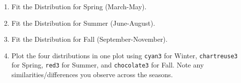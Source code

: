 \documentclass{article}\usepackage[]{graphicx}\usepackage[]{xcolor}
\begin{document}
\begin{enumerate}
\begin{enumerate}
    \item Fit the Distribution for Spring (March-May).
    \item Fit the Distribution for Summer (June-August).
    \item Fit the Distribution for Fall (September-November).
    \item Plot the four distributions in one plot using \texttt{cyan3} for Winter,
    \texttt{chartreuse3} for Spring, \texttt{red3} for Summer, and \texttt{chocolate3}
    for Fall. Note any similarities/differences you observe across the seasons.
  \end{enumerate}
\end{enumerate}


\end{document}
